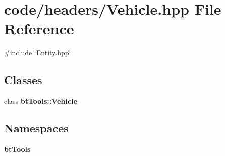 \section{code/headers/\+Vehicle.hpp File Reference}
\label{_vehicle_8hpp}
{\ttfamily \#include \char`\"{}Entity.\+hpp\char`\"{}}\newline
\subsection*{Classes}
\begin{DoxyCompactItemize}
\item 
class \textbf{ bt\+Tools\+::\+Vehicle}
\end{DoxyCompactItemize}
\subsection*{Namespaces}
\begin{DoxyCompactItemize}
\item 
 \textbf{ bt\+Tools}
\end{DoxyCompactItemize}
